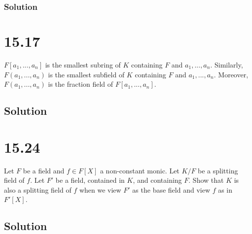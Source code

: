 \documentclass[fleqn]{article}
\begin{document}
            \subsubsection{Solution}
            
    
    \section{15.17}
    $F[a_1, ..., a_n]$ is the smallest subring of $K$ containing $F$ and $a_1, ..., a_n$.  Similarly, $F(a_1, ..., a_n)$ is the smallest subfield of $K$ containing $F$ and $a_1, ..., a_n$.  Moreover, $F(a_1, ..., a_n)$ is the fraction field of $F[a_1, ..., a_n]$.
    
        \subsection{Solution}
        
    
    \section{15.24}
    Let $F$ be a field and $f \in F[X]$ a non-constant monic.  Let $K/F$ be a splitting field of $f$.  Let $F'$ be a field, contained in $K$, and containing $F$.  Show that $K$ is also a splitting field of $f$ when we view $F'$ as the base field and view $f$ as in $F'[X]$.
    
        \subsection{Solution}
        
    
\end{document}
